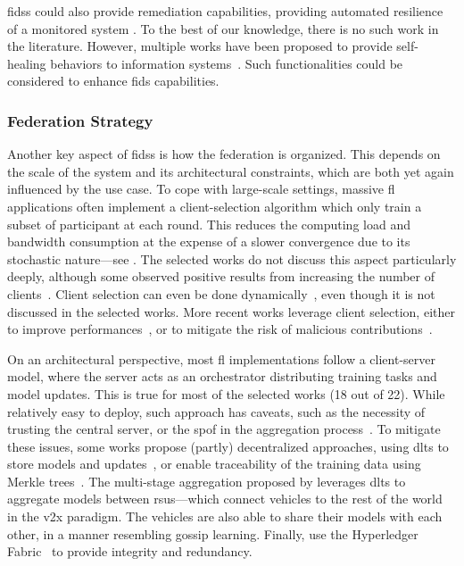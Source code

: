 \Glspl{fids} could also provide remediation capabilities, providing automated resilience of a monitored system \cite{ghosh_Selfhealingsystemssurvey_2007}.
To the best of our knowledge, there is no such work in the literature.
However, multiple works have been proposed to provide self-healing behaviors to information systems~\cite{elsadig_BiologicalIntrusionPrevention_2010,ali-tolppa_SELFHEALINGRESILIENCEFUTURE_2018}.
Such functionalities could be considered to enhance \gls{fids} capabilities.


\subsubsection{Federation Strategy\label{sec:sota.quali.fed}}

Another key aspect of \glspl{fids} is how the federation is organized.
This depends on the scale of the system and its architectural constraints, which are both yet again influenced by the use case.
To cope with large-scale settings, massive \gls{fl} applications often implement a client-selection algorithm which only train a subset of participant at each round.
This reduces the computing load and bandwidth consumption at the expense of a slower convergence due to its stochastic nature---see .
The selected works do not discuss this aspect particularly deeply, although some observed positive results from increasing the number of clients~\cite{li_DeepFedFederatedDeep_2020,schneble_Attackdetectionusing_2019,nguyen_DIoTFederatedSelflearning_2019}.
Client selection can even be done dynamically~\cite{zhang_DynamicFusionbased_2020}, even though it is not discussed in the selected works.
More recent works leverage client selection, either to improve performances~\cite{cheng_FederatedTransferLearning_2022}, or to mitigate the risk of malicious contributions~\cite{cunhaneto_FedSBSFederatedLearningparticipantselection_2024}.

On an architectural perspective, most \gls{fl} implementations follow a client-server model, where the server acts as an orchestrator distributing training tasks and model updates.
This is true for most of the selected works (18 out of 22).
While relatively easy to deploy, such approach has caveats, such as the necessity of trusting the central server, or the \gls{spof} in the aggregation process~\cite{aledhari_FederatedLearningSurvey_2020}.
To mitigate these issues, some works propose (partly) decentralized approaches, using \glspl{dlt} to store models and updates~\cite{rathore_BlockSecIoTNetBlockchainbaseddecentralized_2019}, or enable traceability of the training data using Merkle trees~\cite{zhang_BlockchainbasedFederatedLearning_2020}.
The multi-stage aggregation proposed by \textcite{liu_BlockchainFederatedLearning_2021} leverages \glspl{dlt} to aggregate models between \glspl{rsu}---which connect vehicles to the rest of the world in the \gls{v2x} paradigm.
The vehicles are also able to share their models with each other, in a manner resembling gossip learning.
Finally, \textcite{hei_trustedfeatureaggregator_2020} use the Hyperledger Fabric~\cite{androulaki_HyperledgerFabricDistributed_2018} to provide integrity and redundancy.


